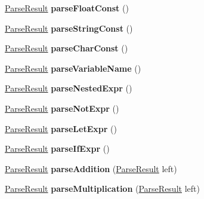 \begin{DoxyCompactItemize}
\item 
\hypertarget{classParser_aaf7b1176fd53246f59577c7eec8b9d22}{\hyperlink{classParseResult}{Parse\-Result} {\bfseries parse\-Float\-Const} ()}\label{classParser_aaf7b1176fd53246f59577c7eec8b9d22}

\item 
\hypertarget{classParser_a4d8930d45c2b730912154c46cc54833c}{\hyperlink{classParseResult}{Parse\-Result} {\bfseries parse\-String\-Const} ()}\label{classParser_a4d8930d45c2b730912154c46cc54833c}

\item 
\hypertarget{classParser_a49c9b3d31ca060c97873e5485d518da3}{\hyperlink{classParseResult}{Parse\-Result} {\bfseries parse\-Char\-Const} ()}\label{classParser_a49c9b3d31ca060c97873e5485d518da3}

\item 
\hypertarget{classParser_a8c1baf62f71da64590e883e51ce622ca}{\hyperlink{classParseResult}{Parse\-Result} {\bfseries parse\-Variable\-Name} ()}\label{classParser_a8c1baf62f71da64590e883e51ce622ca}

\item 
\hypertarget{classParser_aec4c38e1e63c9becfd3a8fc4a1a73f01}{\hyperlink{classParseResult}{Parse\-Result} {\bfseries parse\-Nested\-Expr} ()}\label{classParser_aec4c38e1e63c9becfd3a8fc4a1a73f01}

\item 
\hypertarget{classParser_a1503ceff46112d6d4f0e01b5fb77afcd}{\hyperlink{classParseResult}{Parse\-Result} {\bfseries parse\-Not\-Expr} ()}\label{classParser_a1503ceff46112d6d4f0e01b5fb77afcd}

\item 
\hypertarget{classParser_aa24c33b04779801b330d7fe5a74349e5}{\hyperlink{classParseResult}{Parse\-Result} {\bfseries parse\-Let\-Expr} ()}\label{classParser_aa24c33b04779801b330d7fe5a74349e5}

\item 
\hypertarget{classParser_a555bc6f671d408208e6d049f8e9f3c86}{\hyperlink{classParseResult}{Parse\-Result} {\bfseries parse\-If\-Expr} ()}\label{classParser_a555bc6f671d408208e6d049f8e9f3c86}

\item 
\hypertarget{classParser_ae09cb2b5a7f80c6ad4ad9ccf27a746ca}{\hyperlink{classParseResult}{Parse\-Result} {\bfseries parse\-Addition} (\hyperlink{classParseResult}{Parse\-Result} left)}\label{classParser_ae09cb2b5a7f80c6ad4ad9ccf27a746ca}

\item 
\hypertarget{classParser_a52e6a57d53fc98e5819cc51b3cbe5bd5}{\hyperlink{classParseResult}{Parse\-Result} {\bfseries parse\-Multiplication} (\hyperlink{classParseResult}{Parse\-Result} left)}\label{classParser_a52e6a57d53fc98e5819cc51b3cbe5bd5}


\end{DoxyCompactItemize}
